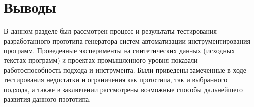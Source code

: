\section{Выводы}

В данном разделе был рассмотрен процесс и результаты тестирования разработанного прототипа генератора систем автоматизации инструментирования программ.
Проведенные эксперименты на синтетических данных (исходных текстах программ) и проектах промышленного уровня показали работоспособность подхода и инструмента.
Были приведены замеченные в ходе тестирования недостатки и ограничения как прототипа, так и выбранного подхода, а также в заключении рассмотрены возможные способы дальнейшего развития данного прототипа.

